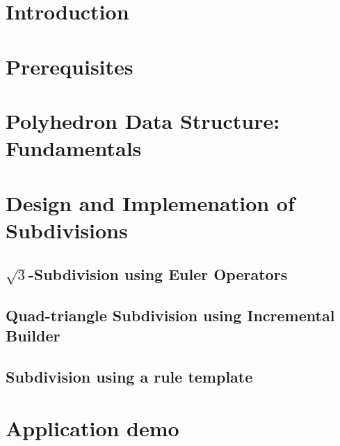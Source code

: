 \documentclass[letter,twoside,10pt]{article}
\begin{document}
\section{Introduction}


\section{Prerequisites}
 

\section{Polyhedron Data Structure: Fundamentals}
 

\section{Design and Implemenation of Subdivisions}

\subsection{$\sqrt{3}$-Subdivision using Euler Operators}


\subsection{Quad-triangle Subdivision using Incremental Builder}
\label{sec:subdivision_builder}


\subsection{Subdivision using a rule template}
\label{sec:subdivision_rule}


\section{Application demo}





\end{document}
